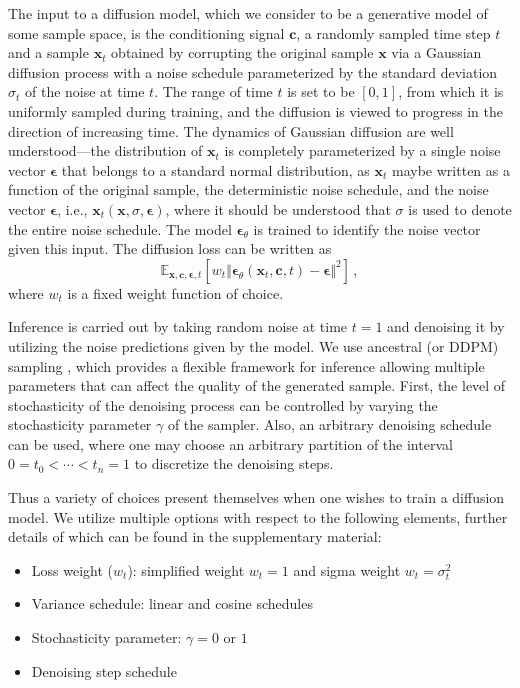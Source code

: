 \documentclass[nohyperref]{article}
\theoremstyle{plain}
\theoremstyle{definition}
\theoremstyle{remark}
\begin{document}
The input to a diffusion model, which we consider to be a generative model of some sample space, is the conditioning signal $\mathbf{c}$, a randomly sampled time step $t$ and a sample $\mathbf{x}_t$ obtained by corrupting the original sample $\mathbf{x}$ via a Gaussian diffusion process with a noise schedule parameterized by the standard deviation $\sigma_t$ of the noise at time $t$. The range of time $t$ is set to be $[0, 1]$, from which it is uniformly sampled during training, and the diffusion is viewed to progress in the direction of increasing time. The dynamics of Gaussian diffusion are well understood---the distribution of $\mathbf{x}_t$ is completely parameterized by a single noise vector $\bm{\epsilon}$ that belongs to a standard normal distribution, as $\mathbf{x}_t$ maybe written as a function of the original sample, the deterministic noise schedule, and the noise vector $\bm{\epsilon}$, i.e., $\mathbf{x}_t(\mathbf{x}, \sigma, \bm{\epsilon})$, where it should be understood that $\sigma$ is used to denote the entire noise schedule. The model $\bm{\epsilon}_\theta$ is trained to identify the noise vector given this input. The diffusion loss can be written as
\begin{equation}
\mathbb{E}_{\mathbf{x}, \mathbf{c}, \bm{\epsilon}, t}
\left[ w_t \Vert  \bm{\epsilon}_\theta (\mathbf{x}_t, \mathbf{c}, t)- \bm{\epsilon} \Vert^2 \right] \,,
\end{equation}
where $w_t$ is a fixed weight function of choice.

Inference is carried out by taking random noise at time $t=1$ and denoising it by utilizing the noise predictions given by the model. We use ancestral (or DDPM) sampling \cite{ho2020denoising}, which provides a flexible framework for inference allowing multiple parameters that can affect the quality of the generated sample. First, the level of stochasticity of the denoising process can be controlled by varying the stochasticity parameter $\gamma$ of the sampler. Also, an arbitrary denoising schedule can be used, where one may choose an arbitrary partition of the interval $0 = t_0 < \cdots < t_n =1$ to discretize the denoising steps.

Thus a variety of choices present themselves when one wishes to train a diffusion model. We utilize multiple options with respect to the following elements, further details of which can be found in the supplementary material:
\begin{itemize}[itemsep=1pt]
\item Loss weight ($w_t$): simplified weight $w_t =1$ \cite{ho2020denoising} and sigma weight $w_t = \sigma_t^2$
\item Variance schedule: linear \cite{ho2020denoising} and cosine \cite{nichol2021improved} schedules
\item Stochasticity parameter: $\gamma= 0$ or $1$
\item Denoising step schedule
\end{itemize}
\end{document}
